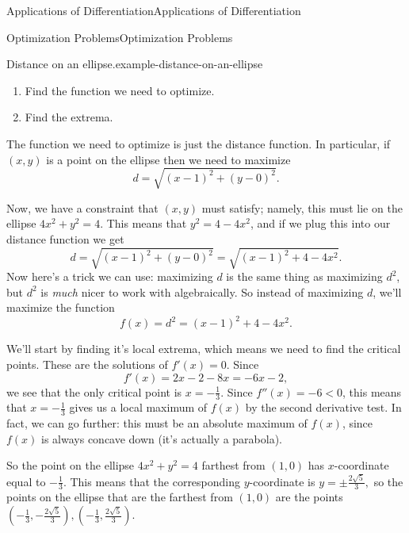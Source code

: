 \documentclass[10pt,]{book}
\numberwithin{equation}{section}
\begin{document}
\begin{chapterptx}{Applications of Differentiation}{}{Applications of Differentiation}{}{}
\begin{sectionptx}{Optimization Problems}{}{Optimization Problems}{}{}
\begin{example}{Distance on an ellipse.}{example-distance-on-an-ellipse}
\begin{enumerate}
\item\hypertarget{li-26}{}Find the function we need to optimize.%
\item\hypertarget{li-27}{}Find the extrema.%
\end{enumerate}
 The function we need to optimize is just the distance function. In particular, if \((x,y)\) is a point on the ellipse then we need to maximize%
\begin{equation*}
d = \sqrt{(x-1)^{2} + (y-0)^{2}}.
\end{equation*}
%
\par
\hypertarget{p-363}{}%
Now, we have a constraint that \((x,y)\) must satisfy; namely, this must lie on the ellipse \(4x^{2} + y^{2} = 4\). This means that \(y^{2} = 4 - 4x^{2}\), and if we plug this into our distance function we get%
\begin{equation*}
d = \sqrt{(x-1)^{2} + (y-0)^{2}} = \sqrt{(x-1)^{2} + 4 - 4x^{2}}.
\end{equation*}
Now here's a trick we can use: maximizing \(d\) is the same thing as maximizing \(d^{2}\), but \(d^{2}\) is \emph{much} nicer to work with algebraically. So instead of maximizing \(d\), we'll maximize the function%
\begin{equation*}
f(x) = d^{2} = (x-1)^{2} + 4 - 4x^{2}.
\end{equation*}
%
\par
\hypertarget{p-364}{}%
We'll start by finding it's local extrema, which means we need to find the critical points. These are the solutions of \(f'(x) = 0\). Since%
\begin{equation*}
f'(x) = 2x - 2 - 8x = -6x - 2,
\end{equation*}
we see that the only critical point is \(x = -\frac{1}{3}\). Since \(f''(x) = -6 < 0\), this means that \(x = -\frac{1}{3}\) gives us a local maximum of \(f(x)\) by the second derivative test. In fact, we can go further: this must be an absolute maximum of \(f(x)\), since \(f(x)\) is always concave down (it's actually a parabola).%
\par
\hypertarget{p-365}{}%
So the point on the ellipse \(4x^{2} + y^{2} = 4\) farthest from \((1,0)\) has \(x\)-coordinate equal to \(-\frac{1}{3}\). This means that the corresponding \(y\)-coordinate is \(y = \pm\frac{2\sqrt{5}}{3},\) so the points on the ellipse that are the farthest from \((1,0)\) are the points \((-\frac{1}{3}, -\frac{2\sqrt{5}}{3}), (-\frac{1}{3}, \frac{2\sqrt{5}}{3}).\)%
\end{example}
\end{sectionptx}

\end{chapterptx}
\end{document}
